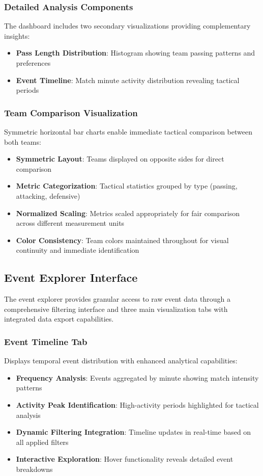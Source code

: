 \documentclass[12pt,a4paper]{article}
\begin{document}
\subsubsection{Detailed Analysis Components}
The dashboard includes two secondary visualizations providing complementary insights:
\begin{itemize}
    \item \textbf{Pass Length Distribution}: Histogram showing team passing patterns and preferences
    \item \textbf{Event Timeline}: Match minute activity distribution revealing tactical periods
\end{itemize}

\subsubsection{Team Comparison Visualization}
Symmetric horizontal bar charts enable immediate tactical comparison between both teams:
\begin{itemize}
    \item \textbf{Symmetric Layout}: Teams displayed on opposite sides for direct comparison
    \item \textbf{Metric Categorization}: Tactical statistics grouped by type (passing, attacking, defensive)
    \item \textbf{Normalized Scaling}: Metrics scaled appropriately for fair comparison across different measurement units
    \item \textbf{Color Consistency}: Team colors maintained throughout for visual continuity and immediate identification
\end{itemize}


\subsection{Event Explorer Interface}

The event explorer provides granular access to raw event data through a comprehensive filtering interface and three main visualization tabs with integrated data export capabilities.


\subsubsection{Event Timeline Tab}
Displays temporal event distribution with enhanced analytical capabilities:
\begin{itemize}
    \item \textbf{Frequency Analysis}: Events aggregated by minute showing match intensity patterns
    \item \textbf{Activity Peak Identification}: High-activity periods highlighted for tactical analysis
    \item \textbf{Dynamic Filtering Integration}: Timeline updates in real-time based on all applied filters
    \item \textbf{Interactive Exploration}: Hover functionality reveals detailed event breakdowns
\end{itemize}
\end{document}

